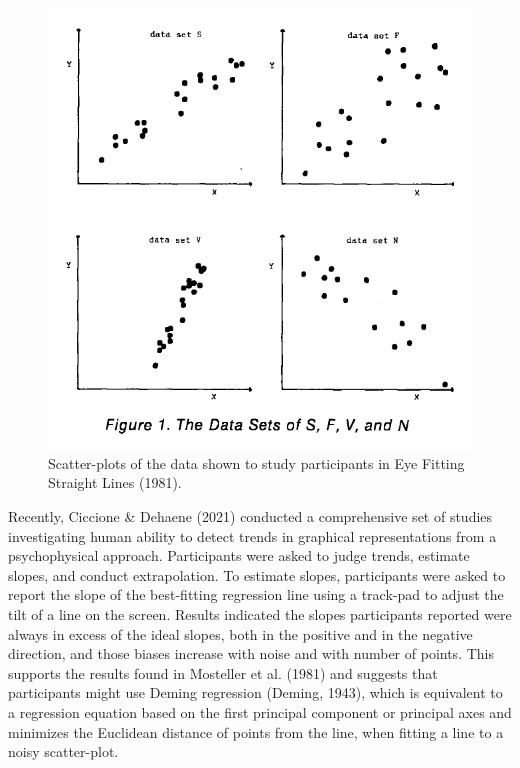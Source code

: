 \documentclass[print]{nuthesis}
\begin{document}
\begin{figure}[tbp]

{\centering \includegraphics[width=0.7\linewidth,]{images/02-you-draw-it/eyefitting-straight-lines-plots} 

}

\caption[Eye Fitting Straight Lines (1981) data sets]{Scatter-plots of the data shown to study participants in Eye Fitting Straight Lines (1981).}\label{fig:mosteller-eyefitting-plot}
\end{figure}

Recently, Ciccione \& Dehaene (2021) conducted a comprehensive set of studies investigating human ability to detect trends in graphical representations from a psychophysical approach.
Participants were asked to judge trends, estimate slopes, and conduct extrapolation.
To estimate slopes, participants were asked to report the slope of the best-fitting regression line using a track-pad to adjust the tilt of a line on the screen.
Results indicated the slopes participants reported were always in excess of the ideal slopes, both in the positive and in the negative direction, and those biases increase with noise and with number of points.
This supports the results found in Mosteller et al. (1981) and suggests that participants might use Deming regression (Deming, 1943), which is equivalent to a regression equation based on the first principal component or principal axes and minimizes the Euclidean distance of points from the line, when fitting a line to a noisy scatter-plot.
\end{document}

